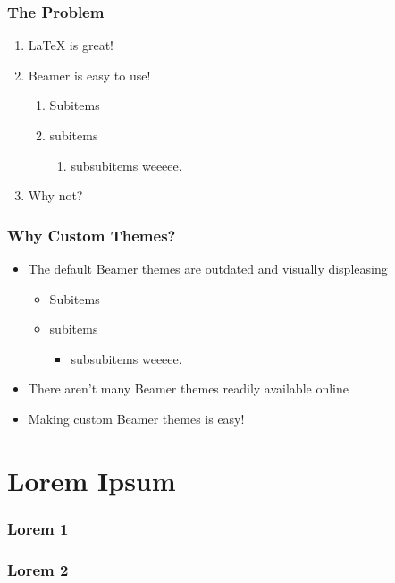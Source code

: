 \documentclass{beamer}
\begin{document}
		\begin{frame}
			\frametitle{The Problem}
			\begin{enumerate}
				\item LaTeX is great!
				\item Beamer is easy to use!
          \begin{enumerate}
            \item Subitems
            \item subitems
            \begin{enumerate}
              \item subsubitems weeeee.
            \end{enumerate}
          \end{enumerate}
				\item Why not?
			\end{enumerate}
		\end{frame}

		\begin{frame}
			\frametitle{Why Custom Themes?}
			\begin{itemize}
				\item The default Beamer themes are outdated and visually displeasing
          \begin{itemize}
            \item Subitems
            \item subitems
            \begin{itemize}
              \item subsubitems weeeee.
            \end{itemize}
          \end{itemize}
				\item There aren't many Beamer themes readily available online
				\item Making custom Beamer themes is easy!
			\end{itemize}
		\end{frame}

	\section{Lorem Ipsum}
		\begin{frame}
			\frametitle{Lorem 1}
			\blindtext
		\end{frame}

		\begin{frame}
			\frametitle{Lorem 2}
			\blindtext
		\end{frame}
\end{document}
